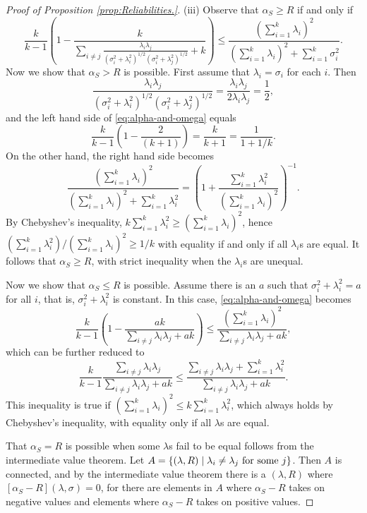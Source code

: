 \documentclass[twoside]{article}
\begin{document}
\begin{proof}[Proof of Proposition \ref{prop:Reliabilities.}]
(iii) 
Observe that $\alpha_{S}\geq R$ if
and only if 
\begin{equation}
\frac{k}{k-1}\left(1-\frac{k}{\sum_{i\neq j}\frac{\lambda_{i}\lambda_{j}}{(\sigma_{i}^{2}+\lambda_{i}^{2})^{1/2}(\sigma_{i}^{2}+\lambda_{j}^{2})^{1/2}}+k}\right)\leq\frac{(\sum_{i=1}^{k}\lambda_{i})^{2}}{(\sum_{i=1}^{k}\lambda_{i})^{2}+\sum_{i=1}^{k}\sigma_{i}^{2}}.\label{eq:alpha-and-omega}
\end{equation}
Now we show that $\alpha_{S}> R$ is possible. First assume that
$\lambda_{i}=\sigma_{i}$ for each $i$. Then 
\[
\frac{\lambda_{i}\lambda_{j}}{(\sigma_{i}^{2}+\lambda_{i}^{2})^{1/2}(\sigma_{i}^{2}+\lambda_{j}^{2})^{1/2}}=\frac{\lambda_{i}\lambda_{j}}{2\lambda_{i}\lambda_{j}}=\frac{1}{2},
\]
and the left hand side of \cref{eq:alpha-and-omega} equals
\[
\frac{k}{k-1}\left(1-\frac{2}{(k+1)}\right)=\frac{k}{k+1}=\frac{1}{1+1/k}.
\]
On the other hand, the right hand side becomes
\[
\frac{(\sum_{i=1}^{k}\lambda_{i})^{2}}{(\sum_{i=1}^{k}\lambda_{i})^{2}+\sum_{i=1}^{k}\lambda_{i}^{2}}=\left(1+\frac{\sum_{i=1}^{k}\lambda_{i}^{2}}{(\sum_{i=1}^{k}\lambda_{i})^{2}}\right)^{-1}.
\]
By Chebyshev's inequality, $k\sum_{i=1}^{k}\lambda_{i}^{2}\geq(\sum_{i=1}^{k}\lambda_{i})^{2}$,
hence $(\sum_{i=1}^{k}\lambda_{i}^{2})/(\sum_{i=1}^{k}\lambda_{i})^{2}\geq1/k$
with equality if and only if all $\lambda_{i}$s are equal. It follows
that $\alpha_{S}\geq R$, with strict inequality when the $\lambda_{i}$s
are unequal.

Now we show that $\alpha_{S}\leq R$ is possible. Assume there
is an $a$ such that $\sigma_{i}^{2}+\lambda_{i}^{2}=a$ for all $i$,
that is, $\sigma_{i}^{2}+\lambda_{i}^{2}$ is constant. In this case,
\cref{eq:alpha-and-omega} becomes
\[
\frac{k}{k-1}\left(1-\frac{ak}{\sum_{i\neq j}\lambda_{i}\lambda_{j}+ak}\right)\leq\frac{(\sum_{i=1}^{k}\lambda_{i})^{2}}{\sum_{i\neq j}\lambda_{i}\lambda_{j}+ak},
\]
which can be further reduced to
\[
\frac{k}{k-1}\frac{\sum_{i\neq j}\lambda_{i}\lambda_{j}}{\sum_{i\neq j}\lambda_{i}\lambda_{j}+ak}\leq\frac{\sum_{i\neq j}\lambda_{i}\lambda_{j}+\sum_{i=1}^{k}\lambda_{i}^{2}}{\sum_{i\neq j}\lambda_{i}\lambda_{j}+ak}.
\]
This inequality is true if $(\sum_{i=1}^{k}\lambda_{i})^{2}\leq k\sum_{i=1}^{k}\lambda_{i}^{2}$,
which always holds by Chebyshev's inequality, with equality only if
all $\lambda$s are equal.

That $\alpha_{S}= R$ is possible when some $\lambda$s fail to
be equal follows from the intermediate value theorem. 
Let $A=\{ (\lambda, R)\mid\lambda_{i}\neq\lambda_{j}\text{\textrm{ for some }}j\} $.
Then $A$ is connected, and by the intermediate value theorem there
is a $(\lambda, R)$ where $[\alpha_S- R](\lambda,\sigma)=0$,
for there are elements in $A$ where $\alpha_S- R$ takes on
negative values and elements where $\alpha_S- R$ takes on positive
values.
\end{proof}
\end{document}

